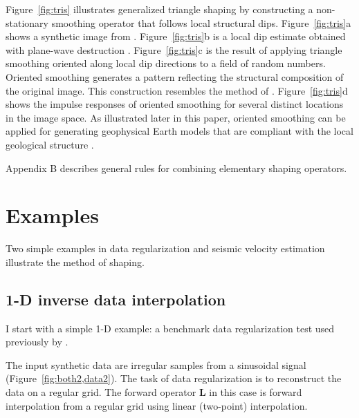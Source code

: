 

Figure~\ref{fig:tris} illustrates generalized triangle shaping by
constructing a non-stationary smoothing operator that follows local
structural dips. Figure~\ref{fig:tris}a shows a synthetic image from
\cite{bei}. Figure~\ref{fig:tris}b is a local dip estimate obtained
with plane-wave destruction
\cite[]{GEO67-06-19461960}. Figure~\ref{fig:tris}c is the result of
applying triangle smoothing oriented along local dip directions to a
field of random numbers. Oriented smoothing generates a pattern
reflecting the structural composition of the original image. This
construction resembles the method of
\cite{EAE-1999-1009}. Figure~\ref{fig:tris}d shows the impulse
responses of oriented smoothing for several distinct locations in the
image space. As illustrated later in this paper, oriented smoothing
can be applied for generating geophysical Earth models that are
compliant with the local geological structure \cite[]{SEG-1993-0591,SEG-1993-0595,clapp}.

Appendix B describes general rules for combining elementary shaping operators.


\section{Examples}
Two simple examples in data regularization and seismic velocity
estimation illustrate the method of shaping.


\subsection{1-D inverse data interpolation}
I start with a simple 1-D example: a benchmark data regularization test used
previously by \cite{GEO68-02-05770588}.


The input synthetic data are irregular samples from a sinusoidal
signal (Figure~\ref{fig:both2,data2}). The task of data regularization
is to reconstruct the data on a regular grid. The forward operator
$\mathbf{L}$ in this case is forward interpolation from a regular grid
using linear (two-point) interpolation.

